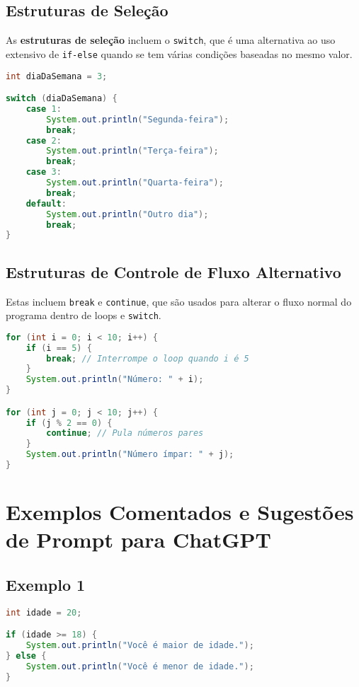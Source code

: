 \documentclass[a4paper,12pt]{book}
\begin{document}
\subsection{Estruturas de Seleção}

As \textbf{estruturas de seleção} incluem o \texttt{switch}, que é uma alternativa ao uso extensivo de \texttt{if-else} quando se tem várias condições baseadas no mesmo valor.

\begin{lstlisting}[language=Java]
int diaDaSemana = 3;

switch (diaDaSemana) {
    case 1:
        System.out.println("Segunda-feira");
        break;
    case 2:
        System.out.println("Terça-feira");
        break;
    case 3:
        System.out.println("Quarta-feira");
        break;
    default:
        System.out.println("Outro dia");
        break;
}
\end{lstlisting}

\subsection{Estruturas de Controle de Fluxo Alternativo}

Estas incluem \texttt{break} e \texttt{continue}, que são usados para alterar o fluxo normal do programa dentro de loops e \texttt{switch}.

\begin{lstlisting}[language=Java]
for (int i = 0; i < 10; i++) {
    if (i == 5) {
        break; // Interrompe o loop quando i é 5
    }
    System.out.println("Número: " + i);
}

for (int j = 0; j < 10; j++) {
    if (j % 2 == 0) {
        continue; // Pula números pares
    }
    System.out.println("Número ímpar: " + j);
}
\end{lstlisting}

\section{Exemplos Comentados e Sugestões de Prompt para ChatGPT}

\subsection{Exemplo 1}

\begin{lstlisting}[language=Java]
int idade = 20;

if (idade >= 18) {
    System.out.println("Você é maior de idade.");
} else {
    System.out.println("Você é menor de idade.");
}
\end{lstlisting}
\end{document}
